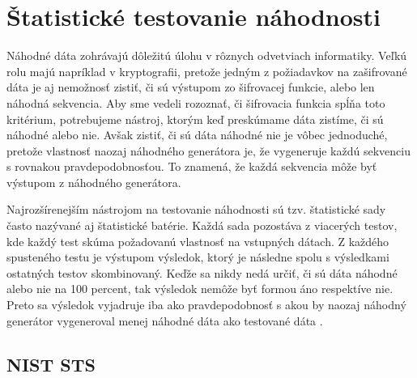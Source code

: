 \chapter{Štatistické testovanie náhodnosti}
\label{chap:statistic-tests}

Náhodné dáta zohrávajú dôležitú úlohu v rôznych odvetviach informatiky. Veľkú rolu majú napríklad v kryptografii, pretože jedným z požiadavkov na zašifrované dáta je aj nemožnosť zistiť, či sú výstupom zo šifrovacej funkcie, alebo len náhodná sekvencia. Aby sme vedeli rozoznať, či šifrovacia funkcia spĺňa toto kritérium, potrebujeme nástroj, ktorým keď preskúmame dáta zistíme, či sú náhodné alebo nie. Avšak zistiť, či sú dáta náhodné nie je vôbec jednoduché, pretože vlastnosť naozaj náhodného generátora je, že vygeneruje každú sekvenciu s rovnakou pravdepodobnosťou. To znamená, že každá sekvencia môže byť výstupom z náhodného generátora.

Najrozšírenejším nástrojom na testovanie náhodnosti sú tzv. štatistické sady často nazývané aj štatistické batérie. Každá sada pozostáva z viacerých testov, kde každý test skúma požadovanú vlastnosť na vstupných dátach. Z každého spusteného testu je výstupom výsledok, ktorý je následne spolu s výsledkami ostatných testov skombinovaný. Keďže sa nikdy nedá určiť, či sú dáta náhodné alebo nie na 100 percent, tak výsledok nemôže byť formou áno respektíve nie. Preto sa výsledok vyjadruje iba ako pravdepodobnosť s akou by naozaj náhodný generátor vygeneroval menej náhodné dáta ako testované dáta \cite{nist-sts-interpretation-syso}. 

\section{NIST STS}
\label{sec:sts-nist}

